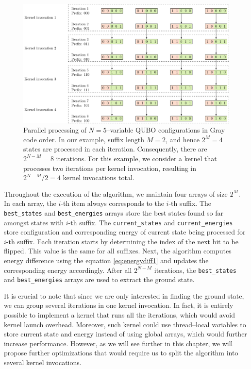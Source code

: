 \begin{figure}
  \includegraphics[width=\textwidth]{figures/grayparallel}
  \caption{
    Parallel processing of $N=5$--variable QUBO configurations in Gray code order.
    In our example, suffix length $M=2$, and hence $2^{M}=4$ states are processed
        in each iteration. Consequently, there are $2^{N-M}=8$ iterations. For this
        example, we consider a kernel that processes two iterations per kernel
        invocation, resulting in $2^{N-M}/2 = 4$ kernel invocations total. }
  \label{fig:grayparallel}
\end{figure}

Throughout the execution of the algorithm, we maintain four arrays of size
$2^{M}$. In each array, the $i$-th item always corresponds to the $i$-th
suffix. The \texttt{best\_states} and \texttt{best\_energies} arrays store the
best states found so far amongst states with $i$-th suffix. The
\texttt{current\_states} and \texttt{current\_energies} store configuration and
corresponding energy of current state being processed for $i$-th suffix. Each
iteration starts by determining the index of the next bit to be flipped. This
value is the same for all suffixes. Next, the algorithm computes energy
difference using the equation \ref{eq:energydiff1} and updates the
corresponding energy accordingly. After all $2^{N-M}$ iterations, the
\texttt{best\_states} and \texttt{best\_energies} arrays are used to extract
the ground state.

It is crucial to note that since we are only interested in finding the ground
state, we can group several iterations in one kernel invocation. In fact, it is
entirely possible to implement a kernel that runs all the iterations, which
would avoid kernel launch overhead. Moreover, such kernel could use
thread--local variables to store current state and energy instead of using
global arrays, which would further increase performance. However, as we will
see further in this chapter, we will propose further optimizations that would
require us to split the algorithm into several kernel invocations.

